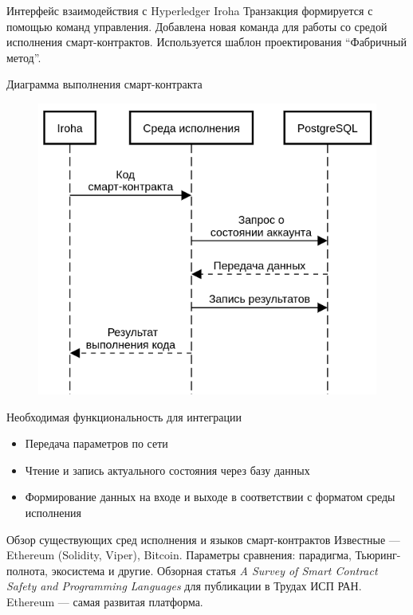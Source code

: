 \documentclass[hyperref={pdfpagelabels=false}]{beamer}
\begin{document}
\begin{frame}{Интерфейс взаимодействия с Hyperledger Iroha}
Транзакция формируется с помощью команд управления.
\vfill
Добавлена новая команда для работы со средой исполнения смарт-контрактов. 
Используется шаблон проектирования “Фабричный метод”.

\end{frame} 

\begin{frame}{Диаграмма выполнения смарт-контракта}
\begin{figure}
\includegraphics[scale=0.44]{interaction.png}
\end{figure}
\end{frame} 

\begin{frame}{Необходимая функциональность для интеграции}
\begin{itemize}
\item Передача параметров по сети
\vfill
\item Чтение и запись актуального состояния через базу данных
\vfill
\item Формирование данных на входе и выходе в соответствии с форматом среды исполнения
\end{itemize}
\end{frame} 

\begin{frame}{Обзор существующих сред исполнения и языков смарт-контрактов}
Известные — Ethereum (Solidity, Viper), Bitcoin. Параметры сравнения: парадигма, Тьюринг-полнота, экосистема и другие.
\vfill
Обзорная статья \emph{A Survey of Smart Contract Safety and Programming Languages} для публикации в Трудах ИСП РАН.
\vfill
Ethereum --- самая развитая платформа.
\end{frame} 
\end{document}
